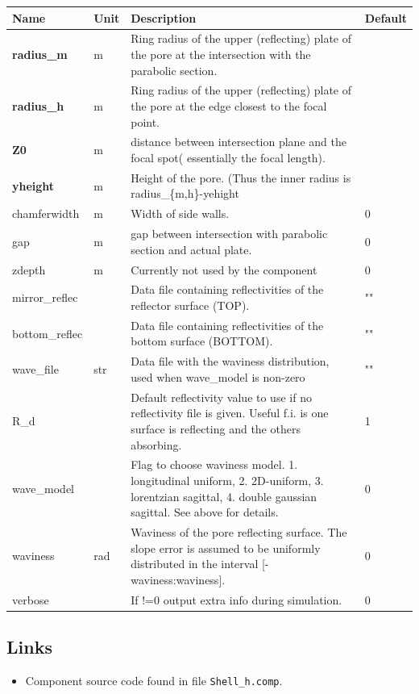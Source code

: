 \begin{longtable}{p{}p{}p{}p{}}
\toprule
\textbf{Name} & \textbf{Unit} & \textbf{Description} & \textbf{Default} \\
\midrule
\endhead
\textbf{radius\_m} & m & Ring radius of the upper (reflecting) plate of the pore at the intersection with the parabolic section. &  \\
\textbf{radius\_h} & m & Ring radius of the upper (reflecting) plate of the pore at the edge closest to the focal point. &  \\
\textbf{Z0} & m & distance between intersection plane and the focal spot( essentially the focal length). &  \\
\textbf{yheight} & m & Height of the pore. (Thus the inner radius is radius\_\{m,h\}-yehight &  \\
chamferwidth & m & Width of side walls. & 0 \\
gap & m & gap between intersection with parabolic section and actual plate. & 0 \\
zdepth & m & Currently not used by the component & 0 \\
mirror\_reflec &   & Data file containing reflectivities of the reflector surface (TOP). & "" \\
bottom\_reflec &   & Data file containing reflectivities of the bottom surface (BOTTOM). & "" \\
wave\_file & str & Data file with the waviness distribution, used when wave\_model is non-zero & "" \\
R\_d &   & Default reflectivity value to use if no reflectivity file is given. Useful f.i. is one surface is reflecting and the others absorbing. & 1 \\
wave\_model &   & Flag to choose waviness model. 1. longitudinal uniform, 2. 2D-uniform, 3. lorentzian sagittal, 4. double gaussian sagittal. See above for details. & 0 \\
waviness & rad & Waviness of the pore reflecting surface. The slope error is assumed to be uniformly distributed in the interval [-waviness:waviness]. & 0 \\
verbose &   & If !=0 output extra info during simulation. & 0 \\
\bottomrule
\end{longtable}

\subsection*{Links}
\begin{itemize}
  \item Component source code found in file \texttt{Shell\_h.comp}.
\end{itemize}
